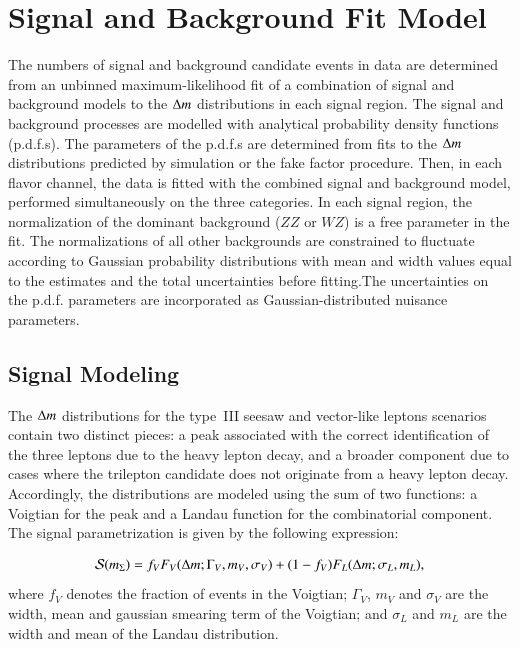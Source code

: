 \section{Signal and Background Fit Model}\label{sec:resonance-fit-method}
The numbers of signal and background candidate events in data are determined from an unbinned maximum-likelihood fit of a combination of signal and background models to the $\Delta m$ distributions in each signal region. The signal and background processes are modelled with analytical probability density functions (p.d.f.s). The parameters of the p.d.f.s are determined from fits to the $\Delta m$ distributions predicted by simulation or the fake factor procedure. Then, in each flavor channel, the data is fitted with the combined signal and background model, performed simultaneously on the three categories. In each signal region, the normalization of the dominant background ($ZZ$ or $WZ$) is a free parameter in the fit. The normalizations of all other backgrounds are constrained to fluctuate according to Gaussian probability distributions with mean and width values equal to the estimates and the total uncertainties before fitting.The uncertainties on the p.d.f. parameters are incorporated as Gaussian-distributed nuisance parameters.

\subsection{Signal Modeling}\label{sec:resonance-signal-model}
The $\Delta m$ distributions for the type~III seesaw and vector-like leptons scenarios contain two distinct pieces: a peak associated with the correct identification of the three leptons due to the heavy lepton decay, and a broader component due to cases where the trilepton candidate does not originate from a heavy lepton decay. Accordingly, the distributions are modeled using the sum of two functions: a Voigtian for the peak and a Landau function for the combinatorial component.  The signal parametrization is given by the following expression: 

\begin{align}\label{eqn:resonance-signal-parametrization}
\mathcal{S}(m_\Sigma) &= f_V F_V(\Delta m; \Gamma_V, m_V,  \sigma_V ) + (1-f_V)F_L(\Delta m; \sigma_L, m_L), \\
\end{align}
where $f_V$ denotes the fraction of events in the Voigtian; $\Gamma_V$, $m_V$ and $\sigma_V$ are the width, mean and gaussian smearing term of the Voigtian; and $\sigma_L$ and $m_L$ are the width and mean of the Landau distribution.  

